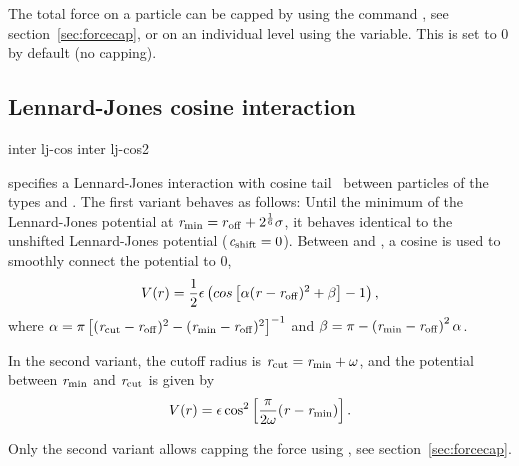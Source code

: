 The total force on a particle can be capped by using the command
, see section~\ref{sec:forcecap}, or on an
individual level using the  variable. This is set
to 0 by default (no capping).

\subsection{Lennard-Jones cosine interaction}
\begin{essyntax}
  inter   lj-cos
  \var{\epsilon} \var{\sigma}
   
  inter   lj-cos2
  \var{\epsilon} \var{\sigma} 
   \var{\omega}
  \begin{features}
  \end{features}
\end{essyntax}
specifies a Lennard-Jones interaction with cosine
tail~\cite{soddeman01a} between particles of the types  and
. The first variant behaves as follows: Until the minimum
of the Lennard-Jones potential at $\mathrm{\mathit{r_\mathrm{min}}} = r_\mathrm{off} +
2^{\frac{1}{6}}\sigma$, it behaves identical to the unshifted
Lennard-Jones potential ($\mathrm{\mathit{c_\mathrm{shift}}}=0$).  Between
 and , a cosine is used to
smoothly connect the potential to 0, \ie
\begin{equation}
  V(r)=\frac{1}{2}\epsilon\left(cos\left[\alpha(\mathrm{\mathit{r}}-\mathrm{\mathit{r_\mathrm{off}}})^2 + \beta\right]-1\right),
\end{equation}
where
$\alpha = \pi\left[(\mathrm{\mathit{r_\mathrm{cut}}}-\mathrm{\mathit{r_\mathrm{off}}})^2-(\mathrm{\mathit{r_\mathrm{min}}}-\mathrm{\mathit{r_\mathrm{off}}})^2\right]^{-1}$
and
$\beta = \pi - \left(\mathrm{\mathit{r_\mathrm{min}}}-\mathrm{\mathit{r_\mathrm{off}}}\right)^2\alpha$.

In the second variant, the cutoff radius is
$\mathrm{\mathit{r_\mathrm{cut}}}=\mathrm{\mathit{r_\mathrm{min}}} + \omega$, and the potential
between $\mathrm{\mathit{r_\mathrm{min}}}$ and $\mathrm{\mathit{r_\mathrm{cut}}}$ is given by
\begin{equation}
  V(r)=\epsilon\cos^2\left[\frac{\pi}{2\omega}(\mathrm{\mathit{r}} - \mathrm{\mathit{r_\mathrm{min}}})\right].
\end{equation}

Only the second variant allows capping the force using , see section~\ref{sec:forcecap}.


